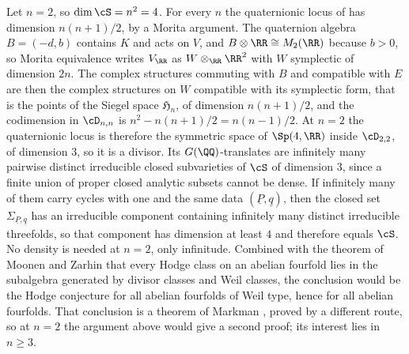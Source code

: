 \begin{remark}[The case $n=2$]\label{rem:ntwo}
Let $n=2$, so $\dim\cS=n^{2}=4$. For every $n$ the quaternionic locus of
 has dimension $n(n+1)/2$, by a Morita argument. The
quaternion algebra $B=(-d,b)$ contains $K$ and acts on $V$, and
$B\otimes\RR\cong M_{2}(\RR)$ because $b>0$, so Morita equivalence writes
$V_{\RR}$ as $W\otimes_{\RR}\RR^{2}$ with $W$ symplectic of dimension $2n$.
The complex structures commuting with $B$ and compatible with $E$ are then
the complex structures on $W$ compatible with its symplectic form, that is the
points of the Siegel
space $\mathfrak{H}_{n}$, of dimension $n(n+1)/2$, and the codimension in
$\cD_{n,n}$ is $n^{2}-n(n+1)/2=n(n-1)/2$. At
$n=2$ the quaternionic locus is therefore the symmetric space of
$\Sp(4,\RR)$ inside $\cD_{2,2}$, of dimension $3$, so it is a divisor. Its
$G(\QQ)$-translates are infinitely many
pairwise distinct irreducible closed subvarieties of $\cS$ of dimension $3$,
since a finite union of proper closed analytic subsets cannot be dense. If
infinitely many of them carry cycles with one and the same data
$(\underline{P},\underline{q})$, then the closed set
$\Sigma_{\underline{P},\underline{q}}$ has an irreducible component containing
infinitely many distinct irreducible threefolds, so that component has
dimension at least $4$ and therefore equals $\cS$. No density is needed at
$n=2$, only infinitude. Combined with the theorem of Moonen and Zarhin
\cite{MZ99} that every Hodge class on an abelian fourfold lies in the
subalgebra generated by divisor classes and Weil classes, the conclusion would
be the Hodge conjecture for all abelian fourfolds of Weil type, hence for all
abelian fourfolds. That conclusion is a theorem of Markman
\cite[Corollary~1.6.1]{Mar25a}, proved by a different route, so at $n=2$ the
argument above would give a second proof; its interest lies in $n\ge3$.
\end{remark}
